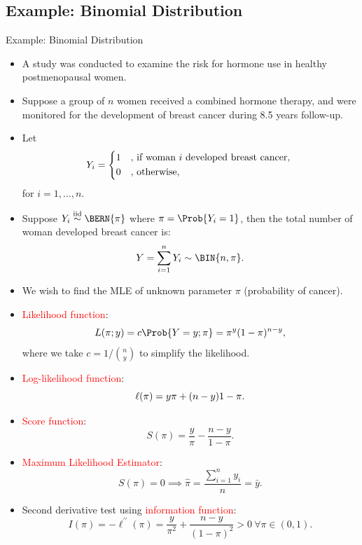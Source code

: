 \documentclass{article}\usepackage[]{graphicx}\usepackage[svgnames]{xcolor}
\let\log\relax%
\newcommand{\iid}{\overset{\text{iid}}{\sim}}%
\begin{document}
\subsection*{Example: Binomial Distribution}
\begin{Example}{Example: Binomial Distribution}
      \begin{itemize}
            \item A study was conducted to examine the risk for hormone use in healthy
                  postmenopausal women.
            \item Suppose a group of $ n $ women received a combined hormone therapy, and were
                  monitored for the development of breast cancer during 8.5 years follow-up.
            \item Let
                  \[ Y_i=\begin{cases*}
                              1 & , if woman $ i $ developed breast cancer, \\
                              0 & , otherwise,
                        \end{cases*} \]
                  for $ i=1,\ldots,n $.
            \item Suppose $ Y_i \iid\BERN{\pi} $ where $ \pi=\Prob{Y_i=1} $, then the total number of woman developed breast cancer is:
                  \[ Y=\sum_{i=1}^{n} Y_i \sim \BIN{n,\pi}. \]
            \item We wish to find the MLE of unknown parameter $ \pi $ (probability of cancer).
      \end{itemize}
\end{Example}
\begin{itemize}
      \item \textcolor{Red}{Likelihood function}:
            \[ L(\pi;y)=c\Prob{Y=y;\pi}=\pi^y(1-\pi)^{n-y}, \]
            where we take $ c=1/\binom{n}{y} $ to simplify the likelihood.
      \item \textcolor{Red}{Log-likelihood function}:
            \[ \ell(\pi)=y\log{\pi}+(n-y)\log{1-\pi}. \]
      \item \textcolor{Red}{Score function}:
            \[ S(\pi)=\frac{y}{\pi}-\frac{n-y}{1-\pi}.  \]
      \item \textcolor{Red}{Maximum Likelihood Estimator}:
            \[ S(\pi)=0\implies \hat{\pi}=\frac{\sum_{i=1}^{n} y_i}{n}=\bar{y}. \]
      \item Second derivative test using \textcolor{Red}{information function}:
            \[ I(\pi)=-\ell^{\prime\prime}(\pi)=\frac{y}{\pi^2}+\frac{n-y}{(1-\pi)^2}>0\ \forall \pi\in(0,1). \]
\end{itemize}
\end{document}
